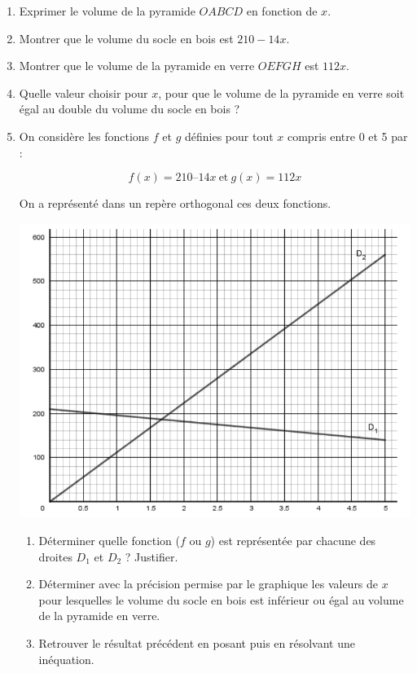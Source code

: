 \begin{enumerate}
\item Exprimer le volume de la pyramide $OABCD$ en fonction de $x$.
\item Montrer que le volume du socle en bois est $210 - 14x$.
\item Montrer que le volume de la pyramide en verre $OEFGH$ est $112x$.
\item Quelle valeur choisir pour $x$, pour que le volume de la pyramide en verre soit égal au
double du volume du socle en bois ?
\item On considère les fonctions $f$ et $g$ définies pour tout $x$ compris entre 0 et 5 par :

$$f(x) = 210 – 14x ~\text{et}~ g(x) = 112x$$

On a représenté dans un repère orthogonal ces deux fonctions.
\begin{center}
	\includegraphics[width=.8\textwidth]{./images/2022-g2-ex3-img3.png}
\end{center}
\begin{enumerate}
	\item Déterminer quelle fonction ($f$ ou $g$) est représentée par chacune des droites $D_1$ et
$D_2$ ? Justifier.
	\item Déterminer avec la précision permise par le graphique les valeurs de $x$ pour
lesquelles le volume du socle en bois est inférieur ou égal au volume de la pyramide en verre.
	\item Retrouver le résultat précédent en posant puis en résolvant une inéquation.
\end{enumerate}
\end{enumerate}